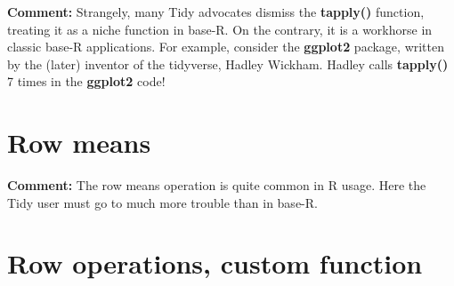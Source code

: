 \documentclass[11pt]{article}
\begin{document}
\textbf{Comment:}  Strangely, many Tidy advocates dismiss the
\textbf{tapply()} function, treating it as a niche function in base-R.
On the contrary, it is a workhorse in classic base-R applications.  For
example, consider the \textbf{ggplot2} package, written by the (later)
inventor of the tidyverse, Hadley Wickham. Hadley calls
\textbf{tapply()} 7 times in the \textbf{ggplot2} code!

\section*{Row means}


\begin{parcolumns}[rulebetween=true]{2}


\hspace{0.1in}


\end{parcolumns}

\textbf{Comment:} The row means operation is quite common in R usage.
Here the Tidy user must go to much more trouble than in base-R.

\section*{Row operations, custom function}
\end{document}
